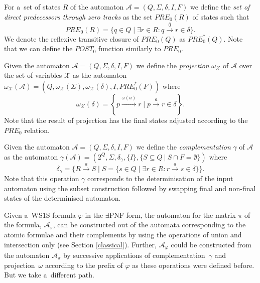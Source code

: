 \begin{defz}
For a~set of states $R$ of the automaton $\mathcal{A} = (Q, \Sigma, \delta, I,
F)$ we define the \emph{set of direct predecessors through zero tracks} as the
set $\mathit{PRE}_0(R)$ of states such that
\begin{equation}
 \mathit{PRE}_0(R) = \{q \in Q \mid \exists r \in R: q
 \overset{\overline{0}}{\longrightarrow} r \in \delta\}.
\end{equation}
We denote the reflexive transitive closure of $\mathit{PRE}_0(Q)$ as
$\mathit{PRE}_0^*(Q)$.
Note that we can define the $\mathit{POST}_0$ function similarly to
$\mathit{PRE}_0$.
\end{defz}

\begin{defz}
 Given the automaton $\mathcal{A} = (Q, \Sigma, \delta, I, F)$ we define the
 \emph{projection} $\omega_\mathcal{X}$ of $\mathcal{A}$ over the set of
 variables $\mathcal{X}$ as the automaton $\omega_\mathcal{X}(\mathcal{A}) = (Q,
 \omega_{\mathcal{X}}(\Sigma), \omega_{\mathcal{X}}(\delta), I,
 \mathit{PRE}_0^*(F))$ where
 \begin{equation}
  \omega_{\mathcal{X}}(\delta) = \left\{ p \overset{\omega(a)}{\longrightarrow}
  r \mid p \overset{a}{\longrightarrow} r \in \delta\right\}.
 \end{equation}
 Note that the result of projection has the final states adjusted
 according to the $\mathit{PRE}_0$ relation.
\end{defz}

\begin{defz}
 Given the automaton $\mathcal{A} = (Q, \Sigma, \delta, I, F)$ we define the
 \emph{complementation} $\gamma$ of $\mathcal{A}$ as the automaton
 $\gamma(\mathcal{A}) = (2^Q, \Sigma, \delta_\gamma, \{I\}, \{S \subseteq Q\
 |\ S \cap F = \emptyset\})$ where
 \begin{equation}
  \delta_\gamma = \{R \overset{a}{\longrightarrow} S \mid S = \{s \in Q \mid \exists
  r \in R: r \overset{a}{\longrightarrow} s \in \delta\}\}.
 \end{equation}
 Note that this operation $\gamma$ corresponds to the determinisation of the
 input automaton using the subset construction followed by swapping final and
 non-final states of the determinised automaton.
\end{defz}

Given a~WS$1$S formula $\varphi$ in the $\exists$PNF form, the automaton for
the matrix $\pi$ of the formula, $\mathcal{A}_\pi$, can be constructed out of
the automata corresponding to the atomic formulae and their complements by
using the operations of union and intersection only (see Section
\ref{classical}).
Further, $\mathcal{A}_\varphi$ could be constructed from the automaton $\mathcal{A}_\pi$ by successive
applications of complementation~$\gamma$ and projection~$\omega$ according to
the prefix of $\varphi$ as these operations were defined before. But we take a~different path.

